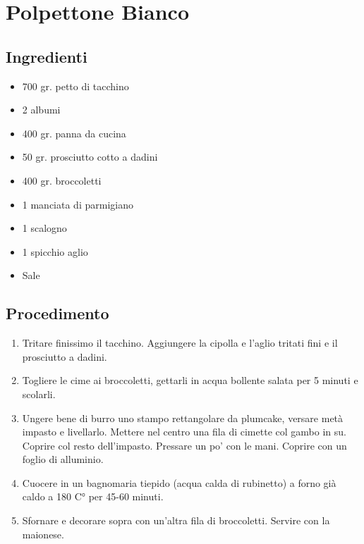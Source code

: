 \section{Polpettone Bianco}
\subsection{Ingredienti}
\begin{itemize}
\item 700 gr. petto di tacchino  
\item 2 albumi  
\item 400 gr. panna da cucina  
\item 50 gr. prosciutto cotto a dadini  
\item 400 gr. broccoletti  
\item 1 manciata di parmigiano  
\item 1 scalogno  
\item 1 spicchio aglio  
\item Sale
\end{itemize}
\subsection{Procedimento}
\begin{enumerate}
\item  Tritare finissimo il tacchino. Aggiungere la cipolla e l'aglio tritati fini e il prosciutto a dadini.  
\item  Togliere le cime ai broccoletti, gettarli in acqua bollente salata per 5 minuti e scolarli.  
\item  Ungere bene di burro uno stampo rettangolare da plumcake, versare metà impasto e livellarlo. Mettere nel centro una fila di cimette col gambo in su. Coprire col resto dell'impasto. Pressare un po' con le mani. Coprire con un foglio di alluminio.   
\item  Cuocere in un bagnomaria tiepido (acqua calda di rubinetto) a forno già caldo a 180 C° per 45-60 minuti.  
\item  Sfornare e decorare sopra con un'altra fila di broccoletti. Servire con la maionese.
\end{enumerate}
